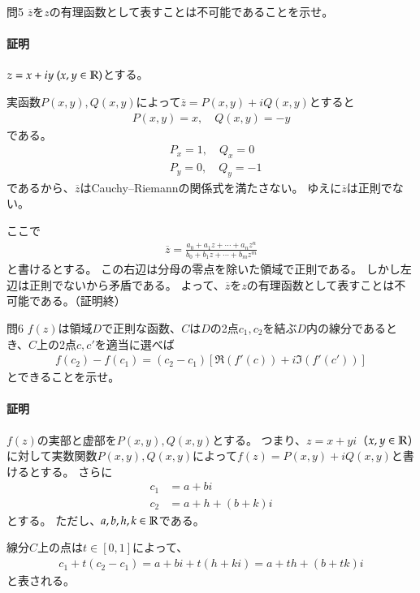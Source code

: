 \begin{mysimplebox}{問5}
    $\overline{z}$を$z$の有理函数として表すことは不可能であることを示せ。
\end{mysimplebox}
\paragraph{証明}
$z=x+iy\ (x,y\in\mathbb{R})$とする。

実函数$P(x,y),Q(x,y)$によって$\overline{z}=P(x,y)+iQ(x,y)$とすると
\begin{align*}
    P(x,y)=x,\quad Q(x,y)=-y
\end{align*}
である。
\begin{align*}
    &P_x=1,\quad Q_x=0\\
    &P_y=0,\quad Q_y=-1
\end{align*}
であるから、$\overline{z}$はCauchy--Riemannの関係式を満たさない。
ゆえに$\overline{z}$は正則でない。

ここで
\begin{align*}
    \overline{z}=\frac{a_0+a_1z+\cdots+a_nz^n}{b_0+b_1z+\cdots+b_mz^m}
\end{align*}
と書けるとする。
この右辺は分母の零点を除いた領域で正則である。
しかし左辺は正則でないから矛盾である。
よって、$\overline{z}$を$z$の有理函数として表すことは不可能である。（証明終）

\begin{mysimplebox}{問6}
    $f(z)$は領域$D$で正則な函数、$C$は$D$の2点$c_1, c_2$を結ぶ$D$内の線分であるとき、$C$上の2点$c, c'$を適当に選べば
    \begin{align*}
        f(c_2)-f(c_1)=(c_2-c_1)[\Re (f'(c))+i\Im(f'(c'))]
    \end{align*}
    とできることを示せ。
\end{mysimplebox}
\paragraph{証明}
$f(z)$の実部と虚部を$P(x,y),Q(x,y)$とする。
つまり、$z=x+yi$（$x,y\in\mathbb{R}$）に対して実数関数$P(x,y),Q(x,y)$によって$f(z)=P(x,y)+iQ(x,y)$と書けるとする。
さらに
\begin{align*}
    c_1&=a+bi\\
    c_2&=a+h+(b+k)i
\end{align*}
とする。
ただし、$a,b,h,k\in\mathbb{R}$である。

線分$C$上の点は$t\in[0,1]$によって、
\begin{align*}
    c_1+t(c_2-c_1)=a+bi+t(h+ki)=a+th+(b+tk)i
\end{align*}
と表される。

